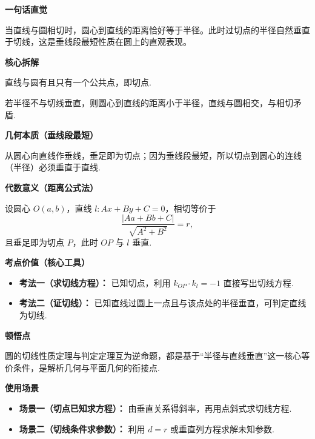\begin{explanationbox}
	\textbf{\textcolor{CExplanation}{一句话直觉}}

	当直线与圆相切时，圆心到直线的距离恰好等于半径。此时过切点的半径自然垂直于切线，这是垂线段最短性质在圆上的直观表现。

	\medskip
	\textbf{\textcolor{CExplanation}{核心拆解}}
	\begin{description}[style=nextline, leftmargin=2.8em, labelsep=0.5em, itemsep=0.45em]
		\item[\textbf{要点一（切线定义）：}] 直线与圆有且只有一个公共点，即切点.
		\item[\textbf{要点二（垂直推导）：}] 若半径不与切线垂直，则圆心到直线的距离小于半径，直线与圆相交，与相切矛盾.
	\end{description}

	\medskip
	\textbf{\textcolor{CExplanation}{几何本质（垂线段最短）}}

	从圆心向直线作垂线，垂足即为切点；因为垂线段最短，所以切点到圆心的连线（半径）必须垂直于直线.

	\medskip
	\textbf{\textcolor{CExplanation}{代数意义（距离公式法）}}

	设圆心 $O(a,b)$，直线 $l:Ax+By+C=0$，相切等价于
	\[
		\frac{|Aa+Bb+C|}{\sqrt{A^2+B^2}} = r,
	\]
	且垂足即为切点 $P$，此时 $OP$ 与 $l$ 垂直.

	\medskip
	\textbf{\textcolor{CExplanation}{考点价值（核心工具）}}
	\begin{itemize}[leftmargin=*, itemsep=0.5em, topsep=0.4em]
		\item \textbf{考法一（求切线方程）：} 已知切点，利用 $k_{OP}\cdot k_l=-1$ 直接写出切线方程.
		\item \textbf{考法二（证切线）：} 已知直线过圆上一点且与该点处的半径垂直，可判定直线为切线.
	\end{itemize}

	\medskip
	\textbf{\textcolor{CExplanation}{顿悟点}}

	圆的切线性质定理与判定定理互为逆命题，都是基于“半径与直线垂直”这一核心等价条件，是解析几何与平面几何的衔接点.

	\medskip
	\textbf{\textcolor{CExplanation}{使用场景}}
	\begin{itemize}[leftmargin=*, itemsep=0.5em, topsep=0.4em]
		\item \textbf{场景一（切点已知求方程）：} 由垂直关系得斜率，再用点斜式求切线方程.
		\item \textbf{场景二（切线条件求参数）：} 利用 $d=r$ 或垂直列方程求解未知参数.
	\end{itemize}
\end{explanationbox}
